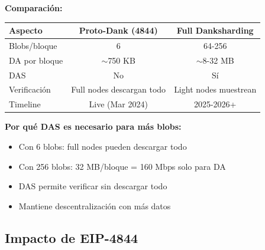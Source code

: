 \documentclass[11pt,a4paper,twoside,openright]{book}
\theoremstyle{definition}
\theoremstyle{plain}
\theoremstyle{remark}
\begin{document}
\begin{mathnote}
\textbf{Comparación:}

\begin{center}
\begin{tabular}{lcc}
\toprule
\textbf{Aspecto} & \textbf{Proto-Dank (4844)} & \textbf{Full Danksharding} \\
\midrule
Blobs/bloque & 6 & 64-256 \\
DA por bloque & $\sim$750 KB & $\sim$8-32 MB \\
DAS & No & Sí \\
Verificación & Full nodes descargan todo & Light nodes muestrean \\
Timeline & Live (Mar 2024) & 2025-2026+ \\
\bottomrule
\end{tabular}
\end{center}

\textbf{Por qué DAS es necesario para más blobs:}
\begin{itemize}
    \item Con 6 blobs: full nodes pueden descargar todo
    \item Con 256 blobs: 32 MB/bloque = 160 Mbps solo para DA
    \item DAS permite verificar sin descargar todo
    \item Mantiene descentralización con más datos
\end{itemize}
\end{mathnote}

\subsection{Impacto de EIP-4844}
\end{document}
